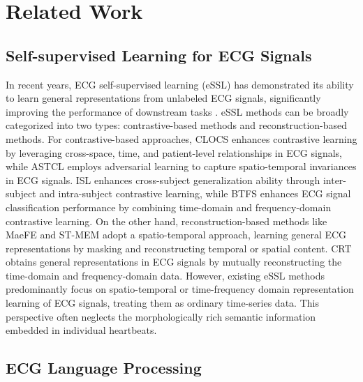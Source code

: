 \section{Related Work}
\subsection{Self-supervised Learning for ECG Signals}
In recent years, ECG self-supervised learning (eSSL) has demonstrated its ability to learn general representations from unlabeled ECG signals, significantly improving the performance of downstream tasks \citep{Practicalintelligent_Lai_2023}. eSSL methods can be broadly categorized into two types: contrastive-based methods and reconstruction-based methods. For contrastive-based approaches, CLOCS \citep{CLOCSContrastive_Kiyasseh_2021a} enhances contrastive learning by leveraging cross-space, time, and patient-level relationships in ECG signals, while ASTCL \citep{AdversarialSpatiotemporal_Wang_2024a} employs adversarial learning to capture spatio-temporal invariances in ECG signals. ISL \citep{lan2022intra} enhances cross-subject generalization ability through inter-subject and intra-subject contrastive learning, while BTFS \citep{yang2022unsupervised} enhances ECG signal classification performance by combining time-domain and frequency-domain contrastive learning. On the other hand, reconstruction-based methods like MaeFE \citep{MaeFEMasked_Zhang_2023} and ST-MEM \citep{na2024guiding} adopt a spatio-temporal approach, learning general ECG representations by masking and reconstructing temporal or spatial content. CRT \citep{Self-SupervisedTime_Zhang_2023} obtains general representations in ECG signals by mutually reconstructing the time-domain and frequency-domain data.  However, existing eSSL methods predominantly focus on spatio-temporal or time-frequency domain representation learning of ECG signals, treating them as ordinary time-series data. This perspective often neglects the morphologically rich semantic information embedded in individual heartbeats.






\subsection{ECG Language Processing}

